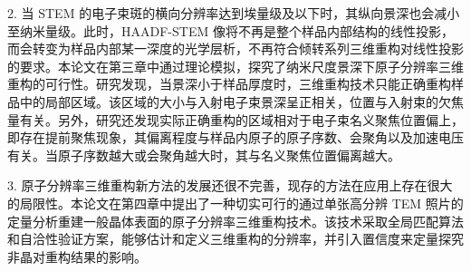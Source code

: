 2. 当 STEM 的电子束斑的横向分辨率达到埃量级及以下时，其纵向景深也会减小至纳米量级。此时，HAADF-STEM 像将不再是整个样品内部结构的线性投影，而会转变为样品内部某一深度的光学层析，不再符合倾转系列三维重构对线性投影的要求。本论文在第三章中通过理论模拟，探究了纳米尺度景深下原子分辨率三维重构的可行性。研究发现，当景深小于样品厚度时，三维重构技术只能正确重构样品中的局部区域。该区域的大小与入射电子束景深呈正相关，位置与入射束的欠焦量有关。另外，研究还发现实际正确重构的区域相对于电子束名义聚焦位置偏上，即存在提前聚焦现象，其偏离程度与样品内原子的原子序数、会聚角以及加速电压有关。当原子序数越大或会聚角越大时，其与名义聚焦位置偏离越大。

3. 原子分辨率三维重构新方法的发展还很不完善，现存的方法在应用上存在很大的局限性。本论文在第四章中提出了一种切实可行的通过单张高分辨 TEM 照片的定量分析重建一般晶体表面的原子分辨率三维重构技术。该技术采取全局匹配算法和自洽性验证方案，能够估计和定义三维重构的分辨率，并引入置信度来定量探究非晶对重构结果的影响。
